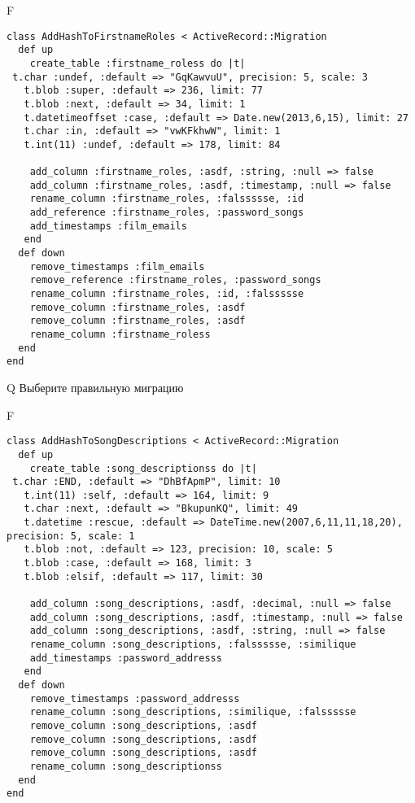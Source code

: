 F
\begin{verbatim}
class AddHashToFirstnameRoles < ActiveRecord::Migration
  def up
    create_table :firstname_roless do |t| 
 t.char :undef, :default => "GqKawvuU", precision: 5, scale: 3
   t.blob :super, :default => 236, limit: 77
   t.blob :next, :default => 34, limit: 1
   t.datetimeoffset :case, :default => Date.new(2013,6,15), limit: 27
   t.char :in, :default => "vwKFkhwW", limit: 1
   t.int(11) :undef, :default => 178, limit: 84

    add_column :firstname_roles, :asdf, :string, :null => false
    add_column :firstname_roles, :asdf, :timestamp, :null => false
    rename_column :firstname_roles, :falssssse, :id
    add_reference :firstname_roles, :password_songs
    add_timestamps :film_emails
   end
  def down
    remove_timestamps :film_emails
    remove_reference :firstname_roles, :password_songs
    rename_column :firstname_roles, :id, :falssssse
    remove_column :firstname_roles, :asdf
    remove_column :firstname_roles, :asdf
    rename_column :firstname_roless
  end
end
\end{verbatim}
Q
Выберите правильную миграцию

F
\begin{verbatim}
class AddHashToSongDescriptions < ActiveRecord::Migration
  def up
    create_table :song_descriptionss do |t| 
 t.char :END, :default => "DhBfApmP", limit: 10
   t.int(11) :self, :default => 164, limit: 9
   t.char :next, :default => "BkupunKQ", limit: 49
   t.datetime :rescue, :default => DateTime.new(2007,6,11,11,18,20), precision: 5, scale: 1
   t.blob :not, :default => 123, precision: 10, scale: 5
   t.blob :case, :default => 168, limit: 3
   t.blob :elsif, :default => 117, limit: 30

    add_column :song_descriptions, :asdf, :decimal, :null => false
    add_column :song_descriptions, :asdf, :timestamp, :null => false
    add_column :song_descriptions, :asdf, :string, :null => false
    rename_column :song_descriptions, :falssssse, :similique
    add_timestamps :password_addresss
   end
  def down
    remove_timestamps :password_addresss
    rename_column :song_descriptions, :similique, :falssssse
    remove_column :song_descriptions, :asdf
    remove_column :song_descriptions, :asdf
    remove_column :song_descriptions, :asdf
    rename_column :song_descriptionss
  end
end
\end{verbatim}

